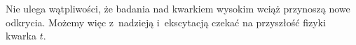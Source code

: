 Nie ulega wątpliwości, że badania nad kwarkiem wysokim wciąż przynoszą nowe odkrycia. Możemy więc z~nadzieją i~ekscytacją czekać na przyszłość fizyki kwarka $t$.



{}
{
}
\eject
\normalsize